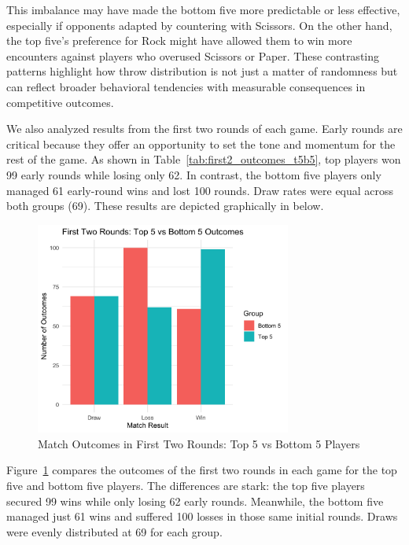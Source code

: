 \documentclass[12pt]{article}
\begin{document}
This imbalance may have made the bottom five more predictable or less effective, especially if opponents adapted by countering with Scissors. On the other hand, the top five’s preference for Rock might have allowed them to win more encounters against players who overused Scissors or Paper. These contrasting patterns highlight how throw distribution is not just a matter of randomness but can reflect broader behavioral tendencies with measurable consequences in competitive outcomes.

We also analyzed results from the first two rounds of each game. Early rounds are critical because they offer an opportunity to set the tone and momentum for the rest of the game. As shown in Table~\ref{tab:first2_outcomes_t5b5}, top players won 99 early rounds while losing only 62. In contrast, the bottom five players only managed 61 early-round wins and lost 100 rounds. Draw rates were equal across both groups (69). These results are depicted graphically in below.

\begin{figure}[H]
\centering
\includegraphics[width=0.75\textwidth]{figures/first2rounds_T5vB5.png}
\caption{Match Outcomes in First Two Rounds: Top 5 vs Bottom 5 Players}
\label{fig:first2rounds_T5vB5}
\end{figure}

Figure~\ref{fig:first2rounds_T5vB5} compares the outcomes of the first two rounds in each game for the top five and bottom five players. The differences are stark: the top five players secured 99 wins while only losing 62 early rounds. Meanwhile, the bottom five managed just 61 wins and suffered 100 losses in those same initial rounds. Draws were evenly distributed at 69 for each group.
\end{document}
